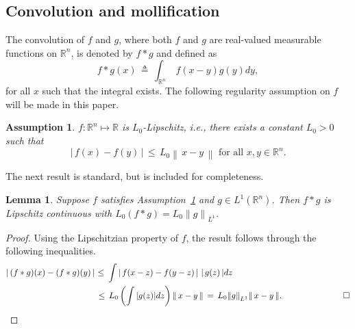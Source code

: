 \documentclass[11pt,reqno]{amsart}
\newcommand{\1}{{\bf 1}}
\newcommand{\2}{{\bf 2}}
\newcommand{\pc}[1]{{\color{cyan}#1}}
\newcommand{\R}{\mathbb R}
\newcommand{\lln}{\left|}
\newcommand{\rrn}{\right|}
\newcommand{\lnn}{\left\|}
\newcommand{\rnn}{\right\|}
\numberwithin{equation}{section}
\newtheorem{lemma}{Lemma}[section]
\newtheorem{assumption}{Assumption}[section]
\theoremstyle{remark}
\begin{document}
		\subsection{Convolution and mollification}\label{sec:Molli}
		The convolution of $f$ and $g$, where both $f$ and $g$ are real-valued measurable functions on $\mathbb{R}^n$,  is denoted by 
		$f*g$ and defined as 
		\begin{equation*}
			f*g(x) \,  \triangleq  \, \int_{\mathbb{R}^n} \ f(x-y)g(y)dy,
		\end{equation*}
		for all $x$ such that the integral exists. %
	The following regularity assumption on $f$ will be made in this paper. 
	\begin{assumption}\label{ass:f-Lip}
		$f: \R^n \mapsto \R$ is $L_0$-Lipschitz, i.e., there exists a constant $L_0>0$ such that
		$$
		\lln \, f(x) - f(y)\, \rrn \, \leq \,  L_0 \lnn \, x-y \, \rnn \text{ for all }x,y \in \R^n. 
		$$ 
	\end{assumption}
	The next result is standard, but is included for completeness.
	\begin{lemma}
		Suppose $f$ satisfies Assumption~\ref{ass:f-Lip} and $g \in L^1(\R^n)$. Then $f \ast g$ is Lipschitz continuous with $L_0(f \ast g) = L_0 {\|g\|}_{L^1}$.  
	\end{lemma}
	\begin{proof}
	Using the Lipschitzian property of $f$, the result follows through the following inequalities.
	\begin{align*}
		\lln \, (f \ast g)(x) - (f \ast g)(y)\, \rrn \, & {\, \le \, } \, \int \lln \, f(x-z) - f(y-z ) \, \rrn\, |\, g(z)\, | dz \, \\
		& \leq \, L_0 \left(\int |g(z)| dz \right)  \|\, x-y\, \|  \, = \,   L_0 {\|g\|}_{L^1} \| \, x - y \, \|. 
		\hspace{1in} \hfill \Box 
	\end{align*}
	\end{proof}
	\vspace{0.1in}
	
\end{document}
